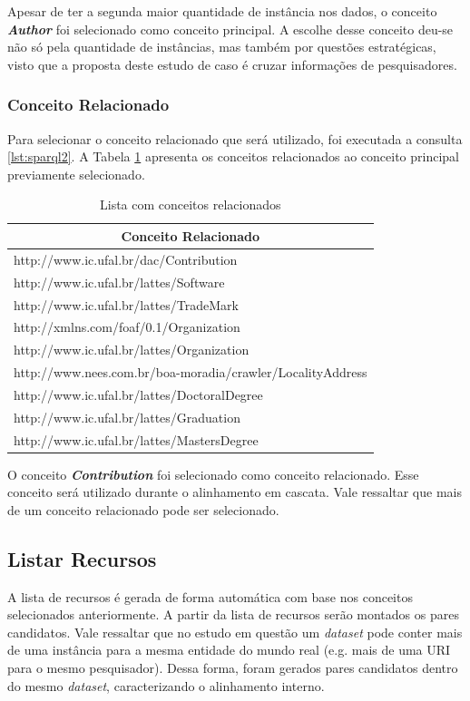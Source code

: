 Apesar de ter a segunda maior quantidade de instância nos dados, o conceito \textbf{\textit{Author}} foi selecionado como conceito principal. A escolhe desse conceito deu-se não só pela quantidade de instâncias, mas também por questões estratégicas, visto que a proposta deste estudo de caso é cruzar informações de pesquisadores.

\subsubsection{Conceito Relacionado}
Para selecionar o conceito relacionado que será utilizado, foi executada a consulta \ref{lst:sparql2}. A Tabela \ref{tab:estudo_sparql2} apresenta os conceitos relacionados ao conceito principal previamente selecionado.

\begin{table}[h]
	\centering
	\caption{Lista com conceitos relacionados}
	\label{tab:estudo_sparql2}
	\begin{tabular}{@{}|l|@{}}
		\hline
		\multicolumn{1}{|c|}{\textbf{Conceito Relacionado}}        \\ \hline
		http://www.ic.ufal.br/dac/Contribution                     \\ \hline
		http://www.ic.ufal.br/lattes/Software                      \\ \hline
		http://www.ic.ufal.br/lattes/TradeMark                     \\ \hline
		http://xmlns.com/foaf/0.1/Organization                     \\ \hline
		http://www.ic.ufal.br/lattes/Organization                  \\ \hline
		http://www.nees.com.br/boa-moradia/crawler/LocalityAddress \\ \hline
		http://www.ic.ufal.br/lattes/DoctoralDegree                \\ \hline
		http://www.ic.ufal.br/lattes/Graduation                    \\ \hline
		http://www.ic.ufal.br/lattes/MastersDegree                 \\ \hline
	\end{tabular}
\end{table}
 
O conceito \textbf{\textit{Contribution}} foi selecionado como conceito relacionado. Esse conceito será utilizado durante o alinhamento em cascata. Vale ressaltar que mais de um conceito relacionado pode ser selecionado.
 
\subsection{Listar Recursos}
A lista de recursos é gerada de forma automática com base nos conceitos selecionados anteriormente. A partir da lista de recursos serão montados os pares candidatos. Vale ressaltar que no estudo em questão um \textit{dataset} pode conter mais de uma instância para a mesma entidade do mundo real (e.g. mais de uma URI para o mesmo pesquisador). Dessa forma, foram gerados pares candidatos dentro do mesmo \textit{dataset}, caracterizando o alinhamento interno.

